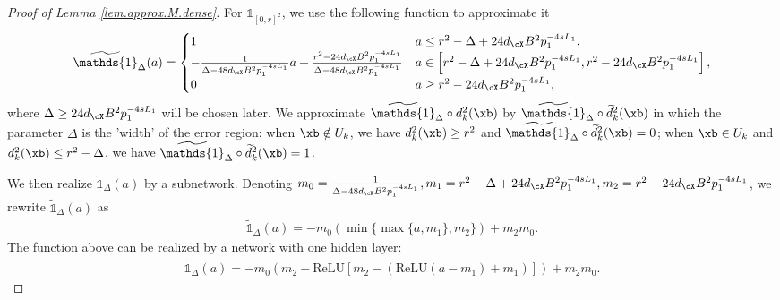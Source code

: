 \documentclass[11pt]{article} %
\newcommand{\ReLU}{\mathrm{ReLU}}
\begin{document}
\begin{proof}[Proof of Lemma \ref{lem.approx.M.dense}]
	For $\mathds{1}_{[0,r]^2}$, we use the following function to approximate it
	\begin{align*}
		\widetilde{\mathds{1}}_{\Delta}(a)=\begin{cases}
			1 & a\leq r^2-\Delta+24d_{\cX}B^2p_1^{-4sL_1},\\
			-\frac{1}{\Delta-48d_{\cX}B^2p_1^{-4sL_1}}a+\frac{r^2-24d_{\cX}B^2p_1^{-4sL_1}}{\Delta-48d_{\cX}B^2p_1^{-4sL_1}} & a\in \left[ r^2-\Delta+24d_{\cX}B^2p_1^{-4sL_1}, r^2-24d_{\cX}B^2p_1^{-4sL_1}\right],\\
			0 & a\geq  r^2-24d_{\cX}B^2p_1^{-4sL_1},
		\end{cases}
	\end{align*}
	where $\Delta\geq  24d_{\cX}B^2p_1^{-4sL_1}$ will be chosen later. We approximate $\widetilde{\mathds{1}}_{\Delta}\circ d_k^2(\xb)$ by $\widetilde{\mathds{1}}_{\Delta}\circ\widetilde{d}_k^2(\xb) $ in which the parameter $\Delta$ is the 'width' of the error region: when $\xb\notin U_k$, we have $d_k^2(\xb)\geq r^2$ and $\widetilde{\mathds{1}}_{\Delta}\circ\widetilde{d}_k^2(\xb)=0$; when $\xb\in U_k$ and $d_k^2(\xb)\leq r^2-\Delta$, we have $\widetilde{\mathds{1}}_{\Delta}\circ\widetilde{d}_k^2(\xb)=1$.
	
	We then realize $\widetilde{\mathds{1}}_{\Delta}(a)$ by a subnetwork. Denoting $m_0=\frac{1}{\Delta-48d_{\cX}B^2p_1^{-4sL_1}}, m_1= r^2-\Delta+24d_{\cX}B^2p_1^{-4sL_1}, m_2=r^2-24d_{\cX}B^2p_1^{-4sL_1}$, we rewrite $\widetilde{\mathds{1}}_{\Delta}(a)$ as
	\begin{align*}
		\widetilde{\mathds{1}}_{\Delta}(a)=-m_0(\min\{\max\{a,m_1\},m_2\})+m_2m_0.
	\end{align*}
	The function above can be realized by a network with one hidden layer:
	\begin{align*}
		\widetilde{\mathds{1}}_{\Delta}(a)=-m_0\left( m_2- \ReLU\left[m_2-\left( \ReLU(a-m_1)+m_1\right) \right]\right)+m_2m_0.
	\end{align*}
	
	

\end{proof}
\end{document}

